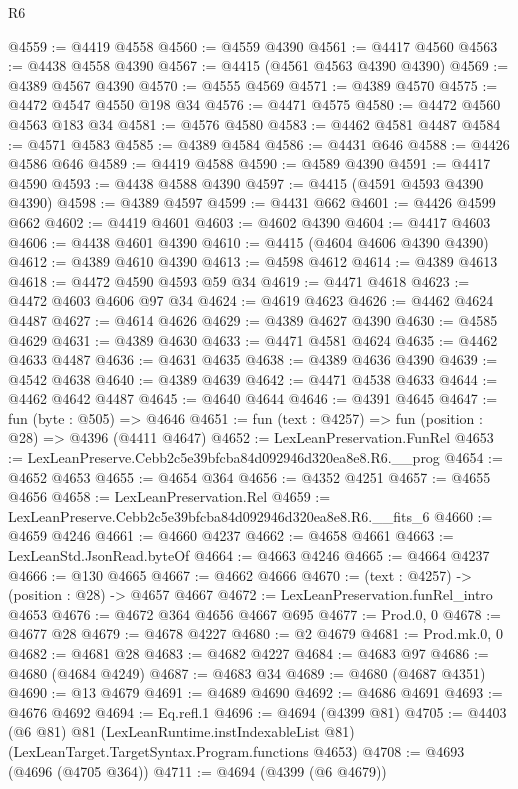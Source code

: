 \begin{lexlean}{R6}
\begin{coremodule}
@4559 := @4419 @4558
@4560 := @4559 @4390
@4561 := @4417 @4560
@4563 := @4438 @4558 @4390
@4567 := @4415 (@4561 @4563 @4390 @4390)
@4569 := @4389 @4567 @4390
@4570 := @4555 @4569
@4571 := @4389 @4570
@4575 := @4472 @4547 @4550 @198 @34
@4576 := @4471 @4575
@4580 := @4472 @4560 @4563 @183 @34
@4581 := @4576 @4580
@4583 := @4462 @4581 @4487
@4584 := @4571 @4583
@4585 := @4389 @4584
@4586 := @4431 @646
@4588 := @4426 @4586 @646
@4589 := @4419 @4588
@4590 := @4589 @4390
@4591 := @4417 @4590
@4593 := @4438 @4588 @4390
@4597 := @4415 (@4591 @4593 @4390 @4390)
@4598 := @4389 @4597
@4599 := @4431 @662
@4601 := @4426 @4599 @662
@4602 := @4419 @4601
@4603 := @4602 @4390
@4604 := @4417 @4603
@4606 := @4438 @4601 @4390
@4610 := @4415 (@4604 @4606 @4390 @4390)
@4612 := @4389 @4610 @4390
@4613 := @4598 @4612
@4614 := @4389 @4613
@4618 := @4472 @4590 @4593 @59 @34
@4619 := @4471 @4618
@4623 := @4472 @4603 @4606 @97 @34
@4624 := @4619 @4623
@4626 := @4462 @4624 @4487
@4627 := @4614 @4626
@4629 := @4389 @4627 @4390
@4630 := @4585 @4629
@4631 := @4389 @4630
@4633 := @4471 @4581 @4624
@4635 := @4462 @4633 @4487
@4636 := @4631 @4635
@4638 := @4389 @4636 @4390
@4639 := @4542 @4638
@4640 := @4389 @4639
@4642 := @4471 @4538 @4633
@4644 := @4462 @4642 @4487
@4645 := @4640 @4644
@4646 := @4391 @4645
@4647 := fun (byte : @505) => @4646
@4651 := fun (text : @4257) => fun (position : @28) => @4396 (@4411 @4647)
@4652 := LexLeanPreservation.FunRel
@4653 := LexLeanPreserve.Cebb2c5e39bfcba84d092946d320ea8e8.R6.__prog
@4654 := @4652 @4653
@4655 := @4654 @364
@4656 := @4352 @4251
@4657 := @4655 @4656
@4658 := LexLeanPreservation.Rel
@4659 := LexLeanPreserve.Cebb2c5e39bfcba84d092946d320ea8e8.R6.__fits_6
@4660 := @4659 @4246
@4661 := @4660 @4237
@4662 := @4658 @4661
@4663 := LexLeanStd.JsonRead.byteOf
@4664 := @4663 @4246
@4665 := @4664 @4237
@4666 := @130 @4665
@4667 := @4662 @4666
@4670 := (text : @4257) -> (position : @28) -> @4657 @4667
@4672 := LexLeanPreservation.funRel_intro @4653
@4676 := @4672 @364 @4656 @4667 @695
@4677 := Prod.{0, 0}
@4678 := @4677 @28
@4679 := @4678 @4227
@4680 := @2 @4679
@4681 := Prod.mk.{0, 0}
@4682 := @4681 @28
@4683 := @4682 @4227
@4684 := @4683 @97
@4686 := @4680 (@4684 @4249)
@4687 := @4683 @34
@4689 := @4680 (@4687 @4351)
@4690 := @13 @4679
@4691 := @4689 @4690
@4692 := @4686 @4691
@4693 := @4676 @4692
@4694 := Eq.refl.{1}
@4696 := @4694 (@4399 @81)
@4705 := @4403
    (@6 @81)
    @81
    (LexLeanRuntime.instIndexableList @81)
    (LexLeanTarget.TargetSyntax.Program.functions @4653)
@4708 := @4693 (@4696 (@4705 @364))
@4711 := @4694 (@4399 (@6 @4679))

\end{coremodule}
\end{lexlean}
